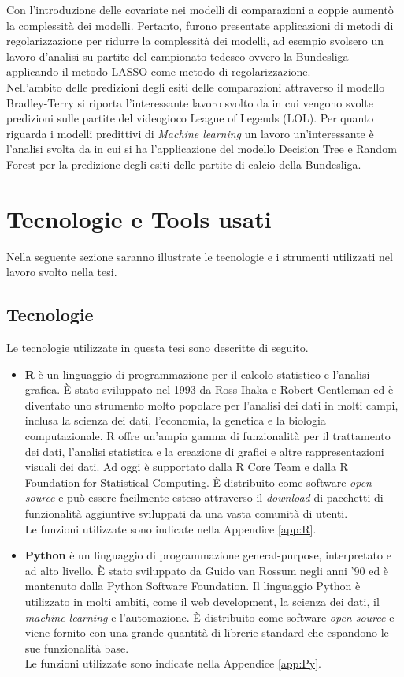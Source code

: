 Con l'introduzione delle covariate nei modelli di comparazioni a coppie aumentò la complessità dei modelli. Pertanto, furono presentate applicazioni di metodi di regolarizzazione per ridurre la complessità dei modelli, ad esempio \textcite{schauberger2019btllasso} svolsero un lavoro d'analisi su partite del campionato tedesco ovvero la Bundesliga applicando il metodo LASSO come metodo di regolarizzazione.\\
Nell'ambito delle predizioni degli esiti delle comparazioni attraverso il modello Bradley-Terry si riporta l’interessante lavoro svolto da \textcite{kang2015poisson} in cui vengono svolte predizioni sulle partite del videogioco League of Legends (LOL). Per quanto riguarda i modelli predittivi di \emph{Machine learning} un lavoro un'interessante è l'analisi svolta da \textcite{xu2021prediction} in cui si ha l'applicazione del modello Decision Tree e Random Forest per la predizione degli esiti delle partite di calcio della Bundesliga.

\section{Tecnologie e Tools usati}
Nella seguente sezione saranno illustrate le tecnologie e i strumenti utilizzati nel lavoro svolto nella tesi. 
\subsection{Tecnologie}
Le tecnologie utilizzate in questa tesi sono descritte di seguito.
\begin{itemize}
	\item \textbf{R} \autocite{R-language} è un linguaggio di programmazione per il calcolo statistico e l'analisi grafica. È stato sviluppato nel 1993 da Ross Ihaka e Robert Gentleman ed è diventato uno strumento molto popolare per l'analisi dei dati in molti campi, inclusa la scienza dei dati, l'economia, la genetica e la biologia computazionale. R offre un'ampia gamma di funzionalità per il trattamento dei dati, l'analisi statistica e la creazione di grafici e altre rappresentazioni visuali dei dati. Ad oggi è supportato dalla R Core Team e dalla R Foundation for Statistical Computing. È distribuito come software \emph{open source} e può essere facilmente esteso attraverso il \emph{download} di pacchetti di funzionalità aggiuntive sviluppati da una vasta comunità di utenti.\\
	Le funzioni utilizzate sono indicate nella Appendice \ref{app:R}.
	\item \textbf{Python} \autocite{van2003introduction} è un linguaggio di programmazione general-purpose, interpretato e ad alto livello. È stato sviluppato da Guido van Rossum negli anni '90 ed è mantenuto dalla Python Software Foundation. Il linguaggio Python è utilizzato in molti ambiti, come il web development, la scienza dei dati, il\emph{ machine learning} e l'automazione. È distribuito come software \emph{open source} e viene fornito con una grande quantità di librerie standard che espandono le sue funzionalità base.\\
	Le funzioni utilizzate sono indicate nella Appendice \ref{app:Py}.
\end{itemize}


